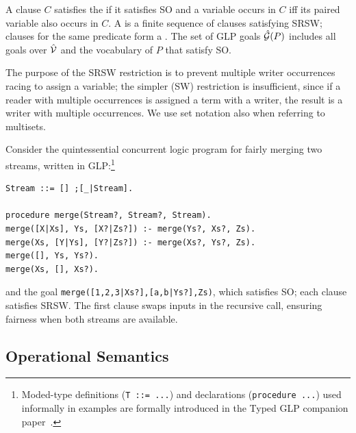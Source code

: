 \begin{definition}
\label{def:glp-program}
A clause $C$ satisfies the  if it satisfies SO and a variable occurs in $C$ iff its paired variable also occurs in $C$.
A  is a finite sequence of clauses satisfying SRSW; clauses for the same predicate form a .
The set of GLP goals $\hat{\mathcal{G}}(P)$ includes all goals over $\hat{\mathcal{V}}$ and the vocabulary of $P$ that satisfy SO.
\end{definition}
The purpose of the SRSW restriction is to prevent multiple writer occurrences racing to assign a variable; the simpler (SW) restriction is insufficient, since if a reader with multiple occurrences is assigned a term with a writer, the result is a writer with multiple occurrences.
We use set notation also when referring to multisets.
\begin{example}
\label{ex:merge}
Consider the quintessential concurrent logic program for fairly merging two streams, written in GLP:\footnote{Moded-type definitions (\texttt{T ::= ...}) and declarations (\texttt{procedure ...}) used informally in examples are formally introduced in the Typed GLP companion paper~\cite{shapiro2026types}.}
\begin{verbatim}
Stream ::= [] ;[_|Stream].

procedure merge(Stream?, Stream?, Stream).
merge([X|Xs], Ys, [X?|Zs?]) :- merge(Ys?, Xs?, Zs).
merge(Xs, [Y|Ys], [Y?|Zs?]) :- merge(Xs?, Ys?, Zs).
merge([], Ys, Ys?).
merge(Xs, [], Xs?).
\end{verbatim}
and the goal \verb=merge([1,2,3|Xs?],[a,b|Ys?],Zs)=, which satisfies SO; each clause satisfies SRSW. The first clause swaps inputs in the recursive call, ensuring fairness when both streams are available.
\end{example}


 

\subsection{Operational Semantics}
\label{sec:glp-operational}

